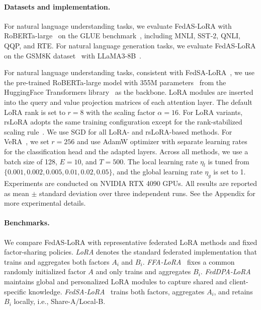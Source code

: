\documentclass[lettersize,journal]{IEEEtran}
\begin{document}
\paragraph{Datasets and implementation.}
For natural language understanding tasks, we evaluate FedAS-LoRA with  RoBERTa-large~\cite{liu2019roberta} on the GLUE benchmark~\cite{wang2018glue}, including MNLI, SST-2, QNLI, QQP, and RTE.  
For natural language generation tasks, we evaluate FedAS-LoRA on the GSM8K dataset~\cite{cobbe2021training} with LLaMA3-8B~\cite{meta2024llama3}. 

For natural language understanding tasks, consistent with FedSA-LoRA~\cite{guo2025selective}, we use the pre-trained RoBERTa-large model with 355M parameters~\cite{liu2019roberta} from the HuggingFace Transformers library~\cite{wolf2020transformers} as the backbone. 
LoRA modules are inserted into the query and value projection matrices of each attention layer. The default LoRA rank is set to $r=8$ with the scaling factor $\alpha=16$. 
For LoRA variants, rsLoRA adopts the same training configuration except for the rank-stabilized scaling rule~\cite{kalajdzievski2023rslora}. We use SGD for all LoRA- and rsLoRA-based methods. For VeRA~\cite{kopiczko2024vera}, we set $r=256$ and use AdamW optimizer \cite{loshchilov2019adamw} with separate learning rates for the classification head and the adapted layers.
Across all methods, we use a batch size of 128, $E=10$, and $T=500$. The local learning rate $\eta_l$ is tuned from $\{0.001,0.002,0.005,0.01,0.02,0.05\}$, and the global learning rate $\eta_g$ is set to 1. 
Experiments are conducted on NVIDIA RTX 4090 GPUs. All results are reported as mean $\pm$ standard deviation over three independent runs.
See the Appendix for more experimental details.


\paragraph{Benchmarks.}
We compare FedAS-LoRA with representative federated LoRA methods and fixed factor-sharing policies. \emph{LoRA} denotes the standard federated implementation that trains and aggregates both factors $A_i$ and $B_i$. \emph{FFA-LoRA}~\cite{sun2024improving} fixes a common randomly initialized factor $A$ and only trains and aggregates $B_i$. \emph{FedDPA-LoRA}~\cite{yang2024dual} maintains global and personalized LoRA modules to capture shared and client-specific knowledge. \emph{FedSA-LoRA}~\cite{guo2025selective} trains both factors, aggregates $A_i$, and retains $B_i$ locally, i.e., Share-A/Local-B. 
\end{document}
